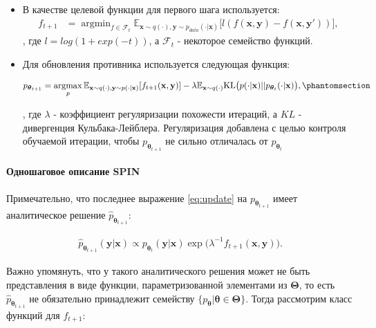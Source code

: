 \documentclass[12pt, twoside]{article}
\newcommand{\bx}{\mathbf{x}}
\newcommand{\by}{\mathbf{y}}
\newcommand{\btheta}{\boldsymbol{\theta}}
\newcommand{\bTheta}{\boldsymbol{\Theta}}
\newcommand{\cF}{\mathcal{F}}
\newcommand{\EE}{\mathbb{E}}
\newcommand{\argmax}{\mathop{\mathrm{argmax}}}
\newcommand{\argmin}{\mathop{\mathrm{argmin}}}
\begin{document}
\begin{itemize}
    \item В качестве целевой функции для первого шага используется:
    \begin{align}
        f_{t+1} &= \argmin_{f \in \cF_{t}}\EE_{\bx\sim q(\cdot), \by\sim p_{data}(\cdot | \bx)}\big[l(f(\bx, \by) - f(\bx, \by')) \big], \label{eq:f*1}
    \end{align}
    , где $l = log(1 + exp(-t))$, а $\cF_t$ - некоторое семейство функций.

    \vspace{8}

    \item Для обновления противника используется следующая функция:
    
    \begin{align} 
        p_{\btheta_{t+1}} = \argmax_ {p}\EE_{\bx \sim q(\cdot), \by\sim p(\cdot|\bx)} [f_{t+1}(\bx, \by)] - \lambda \EE_{\bx\sim q(\cdot)}\mathrm{KL}\big(p(\cdot|\bx)||p_{\btheta_t}(\cdot|\bx)\big), \phantomsection\label{eq:update}
    \end{align} 
    
    , где $\lambda$ - коэффициент регуляризации похожести итераций, а $KL$ - дивергенция Кульбака-Лейблера. Регуляризация добавлена с целью контроля обучаемой итерации, чтобы $p_\btheta_{t+1}$  не сильно отличалась от $p_\btheta_t$
    
    
\end{itemize}

\paragraph{Одношаговое описание SPIN}

Примечательно, что последнее выражение \eqref{eq:update} на $p_{\btheta_{t+1}}$ имеет аналитическое решение $\hat p_{\btheta_{t+1}}$:

\begin{align}
\hat{p}_{\btheta_{t+1}}(\by|\bx) \propto p_{\btheta_t}(\by|\bx) \exp\big(\lambda^{-1}f_{t+1}(\bx, \by)\big). \label{eq:closed form solution}  
\end{align}

Важно упомянуть, что у такого аналитического решения может не быть представления в виде функции, параметризованной элементами из $\bTheta$, то есть $\hat{p}_{\btheta_{t+1}}$ не обязательно принадлежит семейству $\{p_{\btheta} | \btheta \in \bTheta\}$. Тогда рассмотрим класс функций для $f_{t+1}$:
\end{document}
